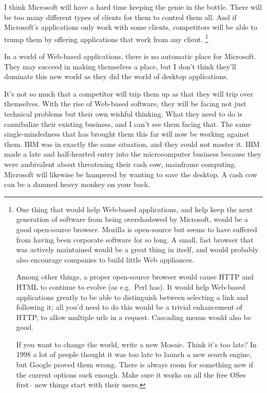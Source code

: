 I think Microsoft will have a hard time keeping the genie in the bottle.
There will be too many different types of clients for them to control
them all. And if Microsoft's applications only work with some clients,
competitors will be able to trump them by offering applications that
work from any client. \footnote{One thing that would help Web-based applications, and help keep
the next generation of software from being overshadowed by Microsoft,
would be a good open-source browser. Mozilla is open-source but seems to
have suffered from having been corporate software for so long. A small,
fast browser that was actively maintained would be a great thing in
itself, and would probably also encourage companies to build little Web
appliances.

Among other things, a proper open-source browser would cause HTTP and
HTML to continue to evolve (as e.g.~Perl has). It would help Web-based
applications greatly to be able to distinguish between selecting a link
and following it; all you'd need to do this would be a trivial
enhancement of HTTP, to allow multiple urls in a request. Cascading
menus would also be good.

If you want to change the world, write a new Mosaic. Think it's too
late? In 1998 a lot of people thought it was too late to launch a new
search engine, but Google proved them wrong. There is always room for
something new if the current options suck enough. Make sure it works on
all the free OSes first-- new things start with their users.}

In a world of Web-based applications, there is no automatic place for
Microsoft. They may succeed in making themselves a place, but I don't
think they'll dominate this new world as they did the world of desktop
applications.

It's not so much that a competitor will trip them up as that they will
trip over themselves. With the rise of Web-based software, they will be
facing not just technical problems but their own wishful thinking. What
they need to do is cannibalize their existing business, and I can't see
them facing that. The same single-mindedness that has brought them this
far will now be working against them. IBM was in exactly the same
situation, and they could not master it. IBM made a late and
half-hearted entry into the microcomputer business because they were
ambivalent about threatening their cash cow, mainframe computing.
Microsoft will likewise be hampered by wanting to save the desktop. A
cash cow can be a damned heavy monkey on your back.

